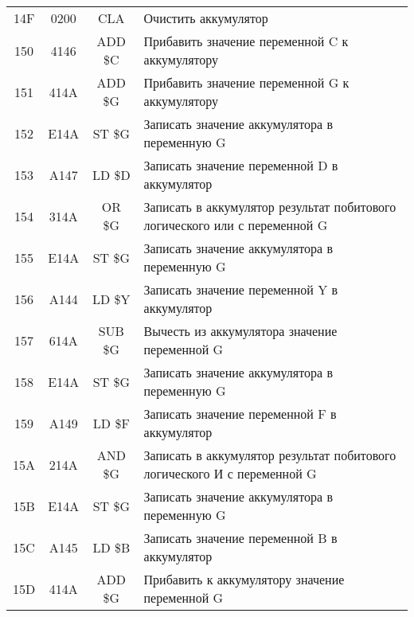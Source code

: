 \begin{table}[h!]
\begin{longtable}{| c | c | c | p{9.5cm} |}
        14F   & 0200        & CLA       & Очистить аккумулятор                                                       \\ %
        150   & 4146        & ADD \$C   & Прибавить значение переменной C к аккумулятору                             \\ %
        151   & 414A        & ADD \$G   & Прибавить значение переменной G к аккумулятору                             \\ %
        152   & E14A        & ST \$G    & Записать значение аккумулятора в переменную G                              \\ %
        153   & A147        & LD \$D    & Записать значение переменной D в аккумулятор                               \\ %
        154   & 314A        & OR \$G    & Записать в аккумулятор результат побитового логического или с переменной G \\ %
        155   & E14A        & ST \$G    & Записать значение аккумулятора в переменную G                              \\ %
        156   & A144        & LD \$Y    & Записать значение переменной Y в аккумулятор                               \\ %
        157   & 614A        & SUB \$G   & Вычесть из аккумулятора значение переменной G                              \\ %
        158   & E14A        & ST \$G    & Записать значение аккумулятора в переменную G                              \\ %
        159   & A149        & LD \$F    & Записать значение переменной F в аккумулятор                               \\ %
        15A   & 214A        & AND \$G   & Записать в аккумулятор результат побитового логического И с переменной G   \\ %
        15B   & E14A        & ST \$G    & Записать значение аккумулятора в переменную G                              \\ %
        15C   & A145        & LD \$B    & Записать значение переменной B в аккумулятор                               \\ %
        15D   & 414A        & ADD \$G   & Прибавить к аккумулятору значение переменной G                             \\ %

\end{longtable}
\end{table}
